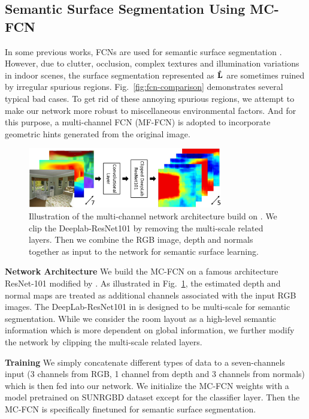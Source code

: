 \subsection{Semantic Surface Segmentation Using MC-FCN}
\label{sec:surfacelabel}
In some previous works, FCNs are used for semantic surface segmentation \cite{dasgupta2016delay,ren2016coarse,mallya2015learning}. 
%
However, due to clutter, occlusion, complex textures and illumination variations in indoor scenes, the surface segmentation represented as $\mathbf{\hat{L}}$ are sometimes ruined by irregular spurious regions. Fig.~\ref{fig:fcn-comparison} demonstrates several typical bad cases.
%
To get rid of these annoying spurious regions, we attempt to make our network more robust to miscellaneous environmental factors. And for this purpose, a multi-channel FCN (MF-FCN) is adopted to incorporate geometric hints generated from the original image. 
%


\begin{figure}
	\centering
	\includegraphics[width=8.5cm]{figure/MC-FCN.png}
	\caption{Illustration of the multi-channel network architecture build on \cite{chen2016deeplab}. We clip the Deeplab-ResNet101 by removing the multi-scale related layers. Then we combine the RGB image, depth and normals together as input to the network for semantic surface learning. }
	\label{fig:fcn-multi-channel}
\end{figure}


\textbf{Network Architecture}
We build the MC-FCN on a famous architecture ResNet-101 \cite{he2016deep} modified by \cite{chen2016deeplab}. As illustrated in Fig.~\ref{fig:fcn-multi-channel}, the estimated depth and normal maps are treated as additional channels associated with the input RGB images. The DeepLab-ResNet101 in \cite{chen2016deeplab} is designed to be multi-scale for semantic segmentation. While we consider the room layout as a high-level semantic information which is more dependent on global information, we further modify the network by clipping the multi-scale related layers. 

\textbf{Training}
We simply concatenate different types of data to a seven-channels input (3 channels from RGB, 1 channel from depth and 3 channels from normals) which is then fed into our network. We initialize the MC-FCN weights with a model pretrained on SUNRGBD dataset except for the classifier layer. Then the MC-FCN is specifically finetuned for semantic surface segmentation. 
%

